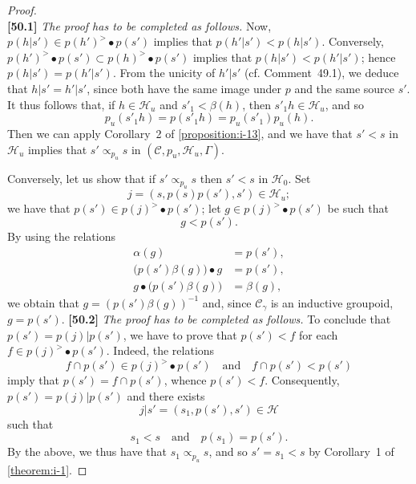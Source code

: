 \documentclass[a4paper,fleqn]{article}
\theoremstyle{plain}
\theoremstyle{definition}
\newenvironment{longcomm}[1]
  {\noindent\textbf{[#1]}\rmfamily}
  {}
\newcommand{\textand}{\quad\text{and}\quad}
\newcommand{\CC}{\mathcal{C}}
\newcommand{\HH}{\mathcal{H}}
\newcommand{\subs}{\mathrel{\propto}}
\newcommand{\smallbullet}{\bullet}
\begin{document}
\begin{proof}
\[  \]
  \begin{longcomm}{50.1}
    \emph{The proof has to be completed as follows.}
    Now, $p(h|s')\in p(h')^>\smallbullet p(s')$ implies that $p(h'|s')<p(h|s')$.
    Conversely, $p(h')^>\smallbullet p(s')\subset p(h)^>\smallbullet p(s')$ implies that $p(h|s')<p(h'|s')$;
    hence $p(h|s')=p(h'|s')$.
    From the unicity of $h'|s'$ (cf. Comment~49.1), we deduce that $h|s'=h'|s'$, since both have the same image under $p$ and the same source $s'$.
  \end{longcomm}
  It thus follows that, if $h\in\HH_u$ and $s'_1<\beta(h)$, then $s'_1h\in\HH_u$, and so
  \[
    p_u(s'_1h)
    = p(s'_1h)
    = p_u(s'_1)p_u(h).
  \]
  Then we can apply Corollary~2 of \cref{proposition:i-13}, and we have that $s'<s$ in $\HH_u$ implies that $s'\subs_{p_u}s$ in $(\CC,p_u,\HH_u,\Gamma)$.

  Conversely, let us show that if $s'\subs_{p_u}s$ then $s'<s$ in $\HH_0$.
  Set
  \[
    j
    = (s, p(s)p(s'), s')
    \in \HH_u;
  \]
  we have that $p(s')\in p(j)^>\smallbullet p(s')$;
  let $g\in p(j)^>\smallbullet p(s')$ be such that
  \[
    g<p(s').
  \]
  By using the relations
  \[
    \begin{aligned}
      \alpha(g)
      &= p(s'),
    \\\big( p(s')\beta(g) \big)\smallbullet g
      &= p(s'),
    \\g\smallbullet\big( p(s')\beta(g) \big)
      &= \beta(g),
    \end{aligned}
  \]
  we obtain that $g=(p(s')\beta(g))^{-1}$ and, since $\CC_\gamma$ is an inductive groupoid, $g=p(s')$.
  \begin{longcomm}{50.2}
    \emph{The proof has to be completed as follows.}
    To conclude that $p(s')=p(j)|p(s')$, we have to prove that $p(s')<f$ for each $f\in p(j)^>\smallbullet p(s')$.
    Indeed, the relations
    \[
      f\cap p(s')
      \in p(j)^>\smallbullet p(s')
      \textand
      f\cap p(s')
      < p(s')
    \]
    imply that $p(s')=f\cap p(s')$, whence $p(s')<f$.
  \end{longcomm}
  Consequently, $p(s')=p(j)|p(s')$ and there exists
  \[
    j|s'
    = (s_1,p(s'),s')
    \in\HH
  \]
  such that
  \[
    s_1<s
    \textand
    p(s_1)=p(s').
  \]
  By the above, we thus have that $s_1\subs_{p_u}s$, and so $s'=s_1<s$ by Corollary~1 of \cref{theorem:i-1}.
\end{proof}
\end{document}
